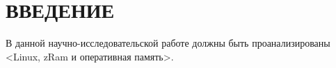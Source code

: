 \section*{ВВЕДЕНИЕ}

В данной научно-исследовательской работе должны быть проанализированы <Linux, zRam и оперативная память>.




\pagebreak
